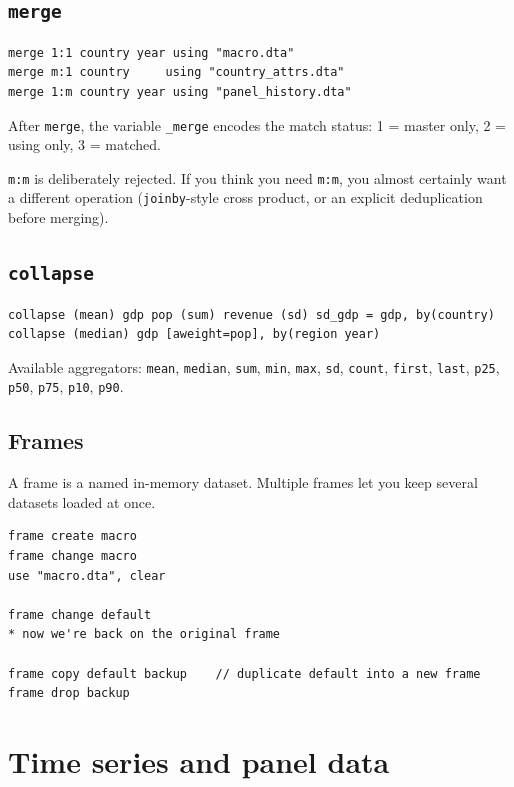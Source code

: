 \documentclass[11pt,letterpaper]{article}
\begin{document}
\subsection{\texttt{merge}}

\begin{lstlisting}
merge 1:1 country year using "macro.dta"
merge m:1 country     using "country_attrs.dta"
merge 1:m country year using "panel_history.dta"
\end{lstlisting}

After \texttt{merge}, the variable \texttt{\_merge} encodes the match
status: 1 = master only, 2 = using only, 3 = matched.

\texttt{m:m} is deliberately rejected.  If you think you need
\texttt{m:m}, you almost certainly want a different operation
(\texttt{joinby}-style cross product, or an explicit deduplication
before merging).

\subsection{\texttt{collapse}}

\begin{lstlisting}
collapse (mean) gdp pop (sum) revenue (sd) sd_gdp = gdp, by(country)
collapse (median) gdp [aweight=pop], by(region year)
\end{lstlisting}

Available aggregators: \texttt{mean}, \texttt{median}, \texttt{sum},
\texttt{min}, \texttt{max}, \texttt{sd}, \texttt{count}, \texttt{first},
\texttt{last}, \texttt{p25}, \texttt{p50}, \texttt{p75}, \texttt{p10},
\texttt{p90}.

\subsection{Frames}

A frame is a named in-memory dataset.  Multiple frames let you keep
several datasets loaded at once.

\begin{lstlisting}
frame create macro
frame change macro
use "macro.dta", clear

frame change default
* now we're back on the original frame

frame copy default backup    // duplicate default into a new frame
frame drop backup
\end{lstlisting}

\section{Time series and panel data}
\end{document}
